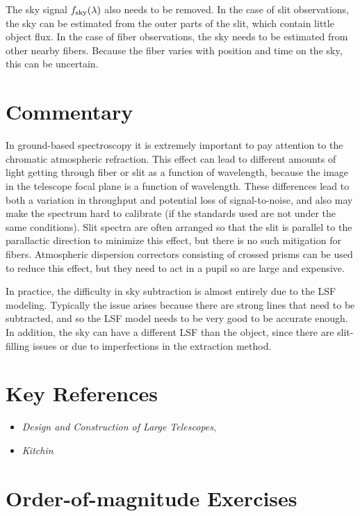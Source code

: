 The sky signal $f_{\rm sky}(\lambda)$ also needs to be removed. In the
case of slit observations, the sky can be estimated from the outer
parts of the slit, which contain little object flux. In the case of
fiber observations, the sky needs to be estimated from other nearby
fibers. Because the fiber varies with position and time on the sky,
this can be uncertain.

\section{Commentary}

In ground-based spectroscopy it is extremely important to pay
attention to the chromatic atmospheric refraction. This effect can
lead to different amounts of light getting through fiber or slit as a
function of wavelength, because the image in the telescope focal plane
is a function of wavelength. These differences lead to both a
variation in throughput and potential loss of signal-to-noise, and
also may make the spectrum hard to calibrate (if the standards used
are not under the same conditions). Slit spectra are often arranged so
that the slit is parallel to the parallactic direction to minimize
this effect, but there is no such mitigation for fibers. Atmospheric
dispersion correctors consisting of crossed prisms can be used to
reduce this effect, but they need to act in a pupil so are large and
expensive.

In practice, the difficulty in sky subtraction is almost entirely due
to the LSF modeling. Typically the issue arises because there are
strong lines that need to be subtracted, and so the LSF model needs to
be very good to be accurate enough. In addition, the sky can have a
different LSF than the object, since there are slit-filling
issues or due to imperfections in the extraction method.

\section{Key References}

\begin{itemize}
  \item
    {\it Design and Construction of Large Telescopes},
      \citet{bely03a}
  \item
    {\it Kitchin}
\end{itemize}

\citet{gunn06a}

\section{Order-of-magnitude Exercises}

